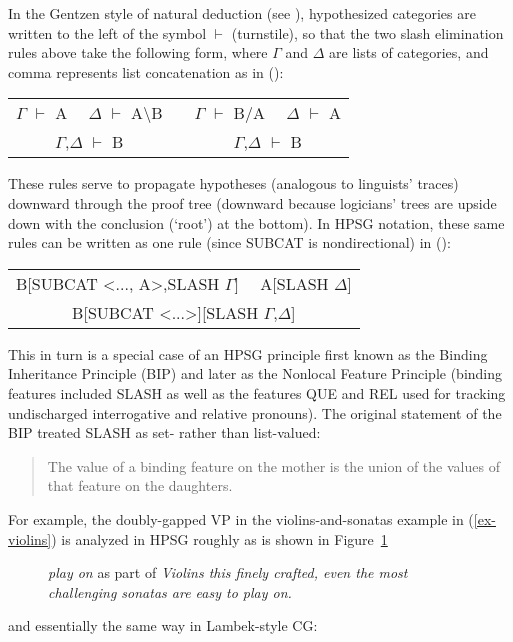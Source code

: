 \documentclass[output=paper]{langsci/langscibook}
\begin{document}
In the Gentzen style of natural deduction (see \citet{Pollard:2013}), hypothesized categories are written to the left of the symbol $\vdash$ (turnstile), so that the two slash elimination rules above take the following form, where $\Gamma$ and $\Delta$ are lists of categories, and comma represents list concatenation as in ():

\ea
\begin{tabular}[t]{ccc}
$\Gamma$ $\vdash$ A \ \ $\Delta$ $\vdash$ A{\textbackslash}B  & &     $\Gamma$ $\vdash$ B/A \ \ $\Delta$ $\vdash$ A \\ \cline{1-1} \cline{3-3}
$\Gamma$,$\Delta$ $\vdash$ B & & $\Gamma$,$\Delta$ $\vdash$ B 
\end{tabular}
\z

\noindent
These rules serve to propagate hypotheses (analogous to linguists' traces) downward through the proof tree (downward because logicians' trees are
upside down with the conclusion (`root') at the bottom). In HPSG notation, these same rules can be written as one rule (since SUBCAT is
nondirectional) in ():

\ea
\begin{tabular}[t]{c}
B[SUBCAT <..., A>,SLASH $\Gamma$] \ \ A[SLASH $\Delta$] \\ \cline{1-1}
B[SUBCAT <...>][SLASH $\Gamma$,$\Delta$]
\end{tabular}
\z

This in turn is a special case of an HPSG principle first known as the Binding Inheritance Principle (BIP) and later as the Nonlocal Feature Principle (binding features included SLASH as well as the features QUE
and REL used for tracking undischarged interrogative and relative pronouns). The original statement of the BIP \citep{Pollard:1986} treated SLASH as set- rather than list-valued:

\begin{quote}
The value of a binding feature on the mother is the union of the values of that feature on the daughters.
\end{quote}

\noindent
For example, the doubly-gapped VP in the violins-and-sonatas example in (\ref{ex-violins}) is analyzed in HPSG roughly  as
is shown in Figure~\ref{fig-play-on}
\begin{figure}
\caption{\label{fig-play-on}\emph{play on} as part of \emph{Violins this finely crafted, even the most challenging sonatas are easy to play on.}}
\end{figure}
and essentially the same way in Lambek-style CG:
\end{document}
